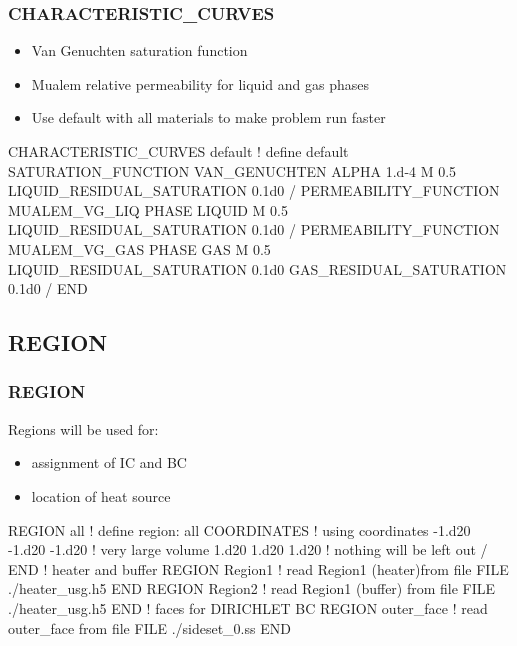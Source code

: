 \documentclass{beamer}
\newcommand\redcomment[1]{{{\color{red} #1}}}
\newcommand\bluecomment[1]{{{\color{blue} #1}}}
\newcommand\greencomment[1]{{{\color{green} #1}}}
\begin{document}
\begin{frame}\frametitle{CHARACTERISTIC\_CURVES}
\begin{itemize}\small
  \item Van Genuchten \redcomment{saturation function}
  \item Mualem \redcomment{relative permeability} for liquid and gas phases
  \item Use \greencomment{default} with all materials to make problem run faster
\end{itemize}
\begin{semiverbatim}\small
CHARACTERISTIC_CURVES default \bluecomment{! define} \greencomment{default}
  SATURATION_FUNCTION VAN_GENUCHTEN
    ALPHA 1.d-4
    M 0.5
    LIQUID_RESIDUAL_SATURATION 0.1d0
  /
  PERMEABILITY_FUNCTION MUALEM_VG_LIQ
    PHASE LIQUID
    M 0.5
    LIQUID_RESIDUAL_SATURATION 0.1d0
  /
  PERMEABILITY_FUNCTION MUALEM_VG_GAS
    PHASE GAS
    M 0.5
    LIQUID_RESIDUAL_SATURATION 0.1d0
    GAS_RESIDUAL_SATURATION 0.1d0
  /
END
\end{semiverbatim}
\end{frame}

\subsection{REGION}

\begin{frame}[fragile]\frametitle{REGION}
Regions will be used for:
\begin{itemize}\small
  \item{assignment of \redcomment{IC} and \redcomment{BC}}
  \item{location of heat \redcomment{source}}
\end{itemize}

\begin{semiverbatim}\small
REGION all               \bluecomment{! define region:} \greencomment{all}
  COORDINATES            \bluecomment{! using coordinates}
    -1.d20 -1.d20 -1.d20 \bluecomment{! very large volume}
     1.d20  1.d20  1.d20 \bluecomment{! nothing will be left out}
  /
END
\bluecomment{! heater and buffer}
REGION Region1 \bluecomment{! read} \greencomment{Region1} \bluecomment{(heater)from file}
  FILE ./heater_usg.h5
END
REGION Region2 \bluecomment{! read} \greencomment{Region1} \bluecomment{(buffer) from file}
  FILE ./heater_usg.h5
END
\bluecomment{! faces for DIRICHLET BC}
REGION outer_face \bluecomment{! read} \greencomment{outer_face} \bluecomment{from file}
  FILE ./sideset_0.ss
END
\end{semiverbatim}
\end{frame}
\end{document}
